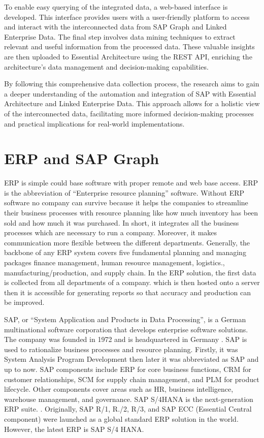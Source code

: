 \documentclass{article}
\begin{document}
To enable easy querying of the integrated data, a web-based interface is developed. This interface provides users with a user-friendly platform to access and interact with the interconnected data from SAP Graph and Linked Enterprise Data. The final step involves data mining techniques to extract relevant and useful information from the processed data. These valuable insights are then uploaded to Essential Architecture using the REST API, enriching the architecture's data management and decision-making capabilities.

By following this comprehensive data collection process, the research aims to gain a deeper understanding of the automation and integration of SAP with Essential Architecture and Linked Enterprise Data. This approach allows for a holistic view of the interconnected data, facilitating more informed decision-making processes and practical implications for real-world implementations.


\maketitle
\section{ERP and SAP Graph}
ERP is simple could base software with proper remote and web base access. ERP is the abbreviation of “Enterprise resource planning” software. Without ERP software no company can survive because it helps the companies to streamline their business processes with resource planning like how much inventory has been sold and how much it was purchased. In short, it integrates all the business processes which are necessary to run a company. Moreover, it makes communication more flexible between the different departments. Generally, the backbone of any ERP system covers five fundamental planning and managing packages finance management, human resource management, logistics., manufacturing/production, and supply chain. In the ERP solution, the first data is collected from all departments of a company. which is then hosted onto a server then it is accessible for generating reports so that accuracy and production can be improved. \parencite{anderson2023}

SAP, or “System Application and Products in Data Processing”, is a German multinational software corporation that develops enterprise software solutions. The company was founded in 1972 and is headquartered in Germany \parencite{lombardi2023}. SAP is used to rationalize business processes and resource planning. Firstly, it was System Analysis Program Development then later it was abbreviated as SAP and up to now. SAP components include ERP for core business functions, CRM for customer relationships, SCM for supply chain management, and PLM for product lifecycle. Other components cover areas such as HR, business intelligence, warehouse management, and governance. SAP S/4HANA is the next-generation ERP suite. \parencite{lombardi2023}. Originally, SAP R/1, R./2, R/3, and SAP ECC (Essential Central component) were launched as a global standard ERP solution in the world. However, the latest ERP is SAP S/4 HANA. 
\end{document}
